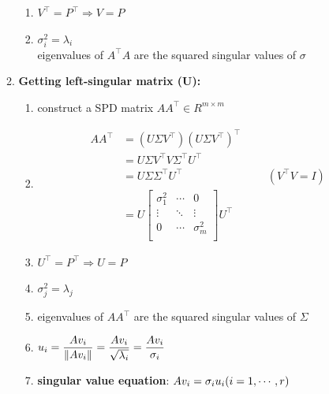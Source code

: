 \begin{enumerate}
\begin{enumerate}
\begin{enumerate}
            \item $V^\top = P^\top \Rightarrow V = P$

            \item $\sigma _i^2 = \lambda_i$\\
            eigenvalues of $A^\top A$ are the squared singular values of $\sigma$ 

        \end{enumerate}

        \vspace{0.2cm}
        \item \textbf{Getting left-singular matrix (U):}
        \begin{enumerate}[itemsep=0.2cm]
            \item construct a SPD matrix $AA^\top \in R^{m\times m}$
            
            \item \begin{align*}
                AA^\top 
                &= (U\Sigma V^\top )(U\Sigma V^\top )^\top \\
                &= U\Sigma V^\top V\Sigma^\top U^\top  \\
                &= U\Sigma \Sigma^\top U^\top  &&& (V^\top V = I) \\
                &= U \begin{bmatrix}
                    \sigma_1^2 & \cdots & 0 \\
                    \vdots & \ddots & \vdots \\
                    0 & \cdots & \sigma_m^2\\
                \end{bmatrix} U^\top
            \end{align*}

            \item $U^\top = P^\top \Rightarrow  U = P$
     
            \item $\sigma_j^2 = \lambda_j$
     
            \item eigenvalues of $AA^\top$ are the squared singular values of $\Sigma$

            \item \( \displaystyle u_i = \dfrac{Av_i}{\left\| Av_i \right\|} = \dfrac{Av_i}{\sqrt{\lambda_i}} = \dfrac{Av_i}{\sigma_i} \)

            \item \textbf{singular value equation}: $ Av_i = \sigma_iu_i  \hfill (i = 1, \cdots , r)$
        \end{enumerate}


\end{enumerate}
\end{enumerate}
